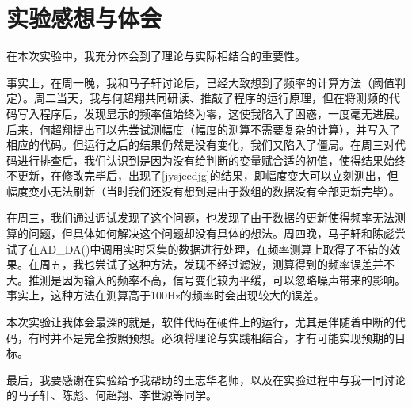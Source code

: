 \documentclass[12pt]{article}
\begin{document}
\section{实验感想与体会}
\setcounter{table}{0}\setcounter{figure}{0}\setcounter{equation}{0}
在本次实验中，我充分体会到了理论与实际相结合的重要性。\par
事实上，在周一晚，我和马子轩讨论后，已经大致想到了频率的计算方法（阈值判定）。周二当天，我与何超翔共同研读、推敲了程序的运行原理，但在将测频的代码写入程序后，发现显示的频率值始终为零，这使我陷入了困惑，一度毫无进展。后来，何超翔提出可以先尝试测幅度（幅度的测算不需要复杂的计算），并写入了相应的代码。但运行之后的结果仍然是没有变化，我们又陷入了僵局。在周三对代码进行排查后，我们认识到是因为没有给判断的变量赋合适的初值，使得结果始终不更新，在修改完毕后，出现了\ref{jysjccdjg}的结果，即幅度变大可以立刻测出，但幅度变小无法刷新（当时我们还没有想到是由于数组的数据没有全部更新完毕）。 \par
在周三，我们通过调试发现了这个问题，也发现了由于数据的更新使得频率无法测算的问题，但具体如何解决这个问题却没有具体的想法。周四晚，马子轩和陈彪尝试了在AD\_DA()中调用实时采集的数据进行处理，在频率测算上取得了不错的效果。在周五，我也尝试了这种方法，发现不经过滤波，测算得到的频率误差并不大。推测是因为输入的频率不高，信号变化较为平缓，可以忽略噪声带来的影响。事实上，这种方法在测算高于100Hz的频率时会出现较大的误差。\par
本次实验让我体会最深的就是，软件代码在硬件上的运行，尤其是伴随着中断的代码，有时并不是完全按照预想。必须将理论与实践相结合，才有可能实现预期的目标。\par
最后，我要感谢在实验给予我帮助的王志华老师，以及在实验过程中与我一同讨论的马子轩、陈彪、何超翔、李世源等同学。
\end{document}
